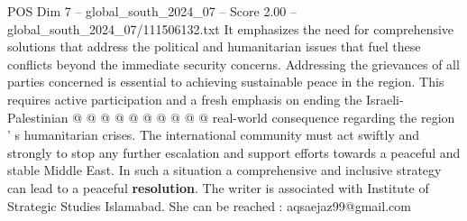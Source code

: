 \begin{textsample}{POS Dim 7 – global\_south\_2024\_07 – Score 2.00 – global\_south\_2024\_07/111506132.txt}
It emphasizes the need for comprehensive solutions that address the political and humanitarian issues that fuel these conflicts beyond the immediate security concerns.
Addressing the grievances of all parties concerned is essential to achieving sustainable peace in the region.
This requires active participation and a fresh emphasis on ending the Israeli-Palestinian @ @ @ @ @ @ @ @ @ @ real-world consequence regarding the region ' s humanitarian crises.
The international community must act swiftly and strongly to stop any further escalation and support efforts towards a peaceful and stable Middle East.
In such a situation a comprehensive and inclusive strategy can lead to a peaceful \textbf{resolution}.
The writer is associated with Institute of Strategic Studies Islamabad.
She can be reached : aqsaejaz99@gmail.com

\end{textsample}
